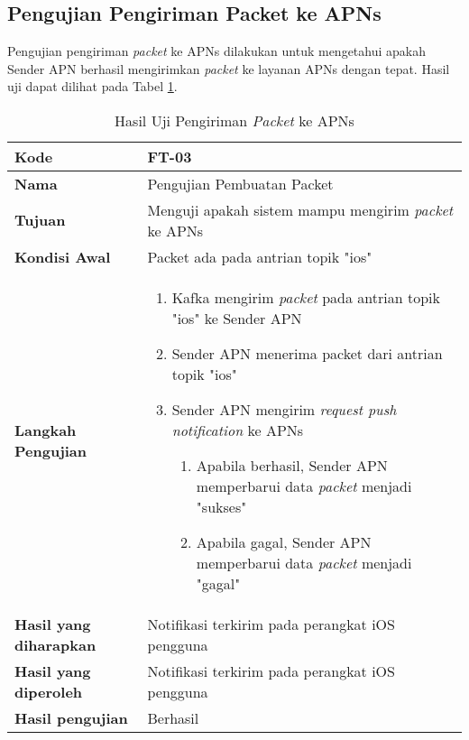 \subsection{Pengujian Pengiriman Packet ke APNs}
\par Pengujian pengiriman \textit{packet} ke APNs dilakukan untuk mengetahui apakah Sender APN berhasil mengirimkan \textit{packet} ke layanan APNs dengan tepat. Hasil uji dapat dilihat pada Tabel \ref{t:uji_pengiriman_packet_apn}.
\begin{longtable}{|p{3cm}|p{6.5cm}|}
	\caption{Hasil Uji Pengiriman \textit{Packet} ke APNs} \label{t:uji_pengiriman_packet_apn} \\ \hline
	\textbf{Kode} & FT-03 \\ \hline
	\textbf{Nama} & Pengujian Pembuatan Packet \\ \hline
	\textbf{Tujuan} & Menguji apakah sistem mampu mengirim \textit{packet} ke APNs \\ \hline
	\textbf{Kondisi Awal} &  Packet ada pada antrian topik "ios"\\ \hline
	\textbf{Langkah Pengujian} &  
	\begin{enumerate}
		\item Kafka mengirim \textit{packet} pada antrian topik "ios" ke Sender APN
		\item Sender APN menerima packet dari antrian topik "ios"
		\item Sender APN mengirim \textit{request push notification} ke APNs
		\begin{enumerate}
			\item Apabila berhasil, Sender APN memperbarui data \textit{packet} menjadi "sukses"
			\item Apabila gagal, Sender APN memperbarui data \textit{packet} menjadi "gagal"
		\end{enumerate}
	\end{enumerate} \\ \hline
	\textbf{Hasil yang diharapkan} & Notifikasi terkirim pada perangkat iOS pengguna \\ \hline
	\textbf{Hasil yang diperoleh} & Notifikasi terkirim pada perangkat iOS pengguna \\ \hline
	\textbf{Hasil pengujian} & Berhasil \\ \hline
\end{longtable}

